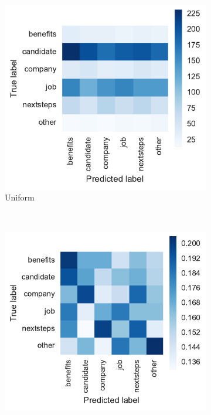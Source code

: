 \begin{figure}[h]
    \centering
    \begin{subfigure}[b]{0.47\textwidth}
        \includegraphics[width=\textwidth]{img/exp-vector-space-conf-matrix-guessing-uniform.pdf}
        \caption{Uniform}
      \label{fig:exp-vector-space-conf-matrix-guessing-uniform}
    \end{subfigure}
    ~
    \begin{subfigure}[b]{0.48\textwidth}
        \includegraphics[width=\textwidth]{img/exp-vector-space-conf-matrix-guessing-uniform-normalized.pdf}

\end{subfigure}
\end{figure}
